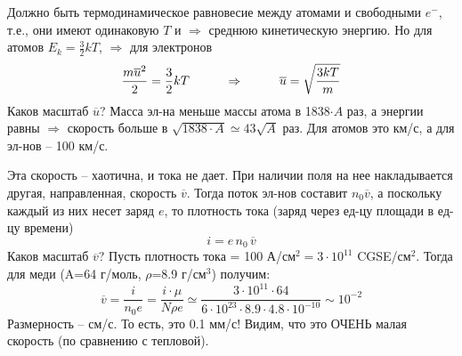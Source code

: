 Должно быть термодинамическое равновесие между атомами и свободными $e^-$, т.е., они имеют одинаковую $T$ и $\Rightarrow$ среднюю кинетическую энергию.  Но для атомов $E_k=\frac32kT$,  $\Rightarrow$ для электронов
 \begin{displaymath}
 \frac{m\overline{u}^2}2 = \frac32kT\hspace{10mm}\Rightarrow\hspace{10mm}\overline{u}=\sqrt{\frac{3kT}{m}}
 \end{displaymath}
Каков масштаб $\overline{u}$?  Масса эл-на меньше массы атома в 1838$\cdot A$ раз, а энергии равны  $\Rightarrow$ скорость больше в $\sqrt{1838\cdot A}\simeq 43\sqrt{A}$ раз. Для атомов это км/с, а для эл-нов -- 100 км/с.

Эта скорость -- хаотична, и тока не дает. При наличии поля на нее накладывается другая, направленная, скорость $\overline{v}$. Тогда поток эл-нов составит $n_0\overline{v}$, а поскольку каждый из них несет заряд $e$, то плотность тока (заряд через ед-цу площади в ед-цу времени)
 \begin{displaymath}
 i=e\,n_0\,\overline{v}
 \end{displaymath}
Каков масштаб $\overline{v}$? Пусть плотность тока = 100 А/см$^2=3\cdot10^{11}$ CGSE/см$^2$. Тогда для меди (A=64 г/моль, $\rho$=8.9 г/см$^3$) получим:
 \begin{displaymath}
 \overline{v}=\frac{i}{n_0e}=\frac{i\cdot\mu}{N\rho e}\simeq\frac{3\cdot10^{11}\cdot64}{6\cdot10^{23}\cdot8.9\cdot4.8\cdot10^{-10}}\sim 10^{-2}
 \end{displaymath}
Размерность -- см/с.  То есть, это 0.1 мм/с! Видим, что это ОЧЕНЬ малая скорость (по сравнению с тепловой).\\[2mm]

